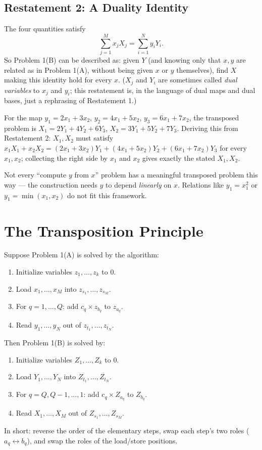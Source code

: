 \documentclass[11pt]{article}
\begin{document}
\subsection{Restatement 2: A Duality Identity}
The four quantities satisfy
\[
  \sum_{j=1}^M x_jX_j = \sum_{i=1}^N y_iY_i.
\]
So Problem 1(B) can be described as: given $Y$ (and knowing only that
$x,y$ are related as in Problem 1(A), without being given $x$ or $y$
themselves), find $X$ making this identity hold for every $x$. ($X_j$
and $Y_i$ are sometimes called \emph{dual variables} to $x_j$ and
$y_i$; this restatement is, in the language of dual maps and dual
bases, just a rephrasing of Restatement 1.)

\begin{examplebox}
For the map $y_1=2x_1+3x_2$, $y_2=4x_1+5x_2$, $y_3=6x_1+7x_2$, the
transposed problem is $X_1=2Y_1+4Y_2+6Y_3$, $X_2=3Y_1+5Y_2+7Y_3$.
Deriving this from Restatement 2: $X_1,X_2$ must satisfy
$x_1X_1+x_2X_2 = (2x_1+3x_2)Y_1+(4x_1+5x_2)Y_2+(6x_1+7x_2)Y_3$ for
every $x_1,x_2$; collecting the right side by $x_1$ and $x_2$ gives
exactly the stated $X_1,X_2$.
\end{examplebox}

\begin{notebox}
Not every ``compute $y$ from $x$'' problem has a meaningful transposed
problem this way --- the construction needs $y$ to depend
\emph{linearly} on $x$. Relations like $y_1=x_1^2$ or
$y_1=\min(x_1,x_2)$ do not fit this framework.
\end{notebox}

\section{The Transposition Principle}
\begin{theorembox}
Suppose Problem 1(A) is solved by the algorithm:
\begin{enumerate}[leftmargin=1.7em]
  \item Initialize variables $z_1,\ldots,z_k$ to $0$.
  \item Load $x_1,\ldots,x_M$ into $z_{s_1},\ldots,z_{s_M}$.
  \item For $q=1,\ldots,Q$: add $c_q\times z_{b_q}$ to $z_{a_q}$.
  \item Read $y_1,\ldots,y_N$ out of $z_{t_1},\ldots,z_{t_N}$.
\end{enumerate}
Then Problem 1(B) is solved by:
\begin{enumerate}[leftmargin=1.7em]
  \item Initialize variables $Z_1,\ldots,Z_k$ to $0$.
  \item Load $Y_1,\ldots,Y_N$ into $Z_{t_1},\ldots,Z_{t_N}$.
  \item For $q=Q,Q-1,\ldots,1$: add $c_q\times Z_{a_q}$ to $Z_{b_q}$.
  \item Read $X_1,\ldots,X_M$ out of $Z_{s_1},\ldots,Z_{s_M}$.
\end{enumerate}
\end{theorembox}
In short: reverse the order of the elementary steps, swap each step's
two roles ($a_q\leftrightarrow b_q$), and swap the roles of the
load/store positions.
\end{document}

